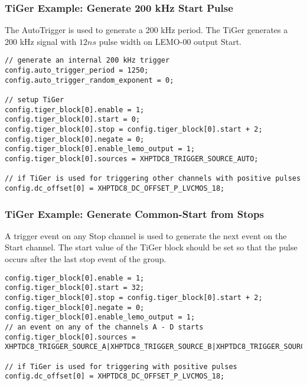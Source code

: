 \subsubsection{TiGer Example: Generate 200 kHz Start Pulse}
The AutoTrigger is used to generate a 200 kHz period. The TiGer generates a 200 kHz signal with $12 ns$ pulse width on LEMO-00 output Start.
\begin{lstlisting}[frame=tlrb]
// generate an internal 200 kHz trigger
config.auto_trigger_period = 1250;
config.auto_trigger_random_exponent = 0;

// setup TiGer
config.tiger_block[0].enable = 1;
config.tiger_block[0].start = 0;
config.tiger_block[0].stop = config.tiger_block[0].start + 2;
config.tiger_block[0].negate = 0;
config.tiger_block[0].enable_lemo_output = 1;
config.tiger_block[0].sources = XHPTDC8_TRIGGER_SOURCE_AUTO;

// if TiGer is used for triggering other channels with positive pulses
config.dc_offset[0] = XHPTDC8_DC_OFFSET_P_LVCMOS_18; 
\end{lstlisting}

\subsubsection{TiGer Example: Generate Common-Start from Stops}
A trigger event on any Stop channel is used to generate the next event on the Start channel. 
The start value of the TiGer block should be set so that the pulse occurs after the last stop event of the group.
\begin{lstlisting}[frame=tlrb]
config.tiger_block[0].enable = 1;
config.tiger_block[0].start = 32;
config.tiger_block[0].stop = config.tiger_block[0].start + 2;
config.tiger_block[0].negate = 0;
config.tiger_block[0].enable_lemo_output = 1;
// an event on any of the channels A - D starts 
config.tiger_block[0].sources = XHPTDC8_TRIGGER_SOURCE_A|XHPTDC8_TRIGGER_SOURCE_B|XHPTDC8_TRIGGER_SOURCE_C|XHPTDC8_TRIGGER_SOURCE_D;

// if TiGer is used for triggering with positive pulses
config.dc_offset[0] = XHPTDC8_DC_OFFSET_P_LVCMOS_18; 
\end{lstlisting}
